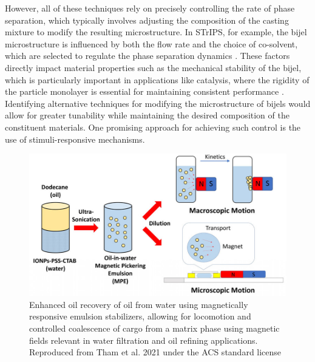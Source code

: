 However, all of these techniques rely on precisely controlling the rate of phase separation, which typically involves adjusting the composition 
of the casting mixture to modify the resulting microstructure. In STrIPS, for example, the bijel microstructure is influenced by both the flow rate 
and the choice of co-solvent, which are selected to regulate the phase separation dynamics \cite{haase_continuous_2015}. These factors directly 
impact material properties such as the mechanical stability of the bijel, which is particularly important in applications like catalysis, where the 
rigidity of the particle monolayer is essential for maintaining consistent performance 
\cite{reeves_particle-size_2015, haase_situ_2016, boakye-ansah_controlling_2020}. Identifying alternative techniques for modifying the microstructure of 
bijels would allow for greater tunability while maintaining the desired composition of the constituent materials. One promising approach for achieving 
such control is the use of stimuli-responsive mechanisms.  

\begin{figure}[h]
    \centering
    \includegraphics[scale = 1]{figures/introduction/magnetophoresis_emulsion.jpeg}
    \caption{Enhanced oil recovery of oil from water using magnetically responsive emulsion stabilizers, allowing for 
             locomotion and controlled coalescence of cargo from a matrix phase using magnetic fields relevant in 
             water filtration and oil refining applications. Reproduced from Tham et al. 2021 under the ACS standard license \cite{tham_magnetophoresis_2021}}
    \label{fig:magnetophoresis_droplet}
\end{figure}

